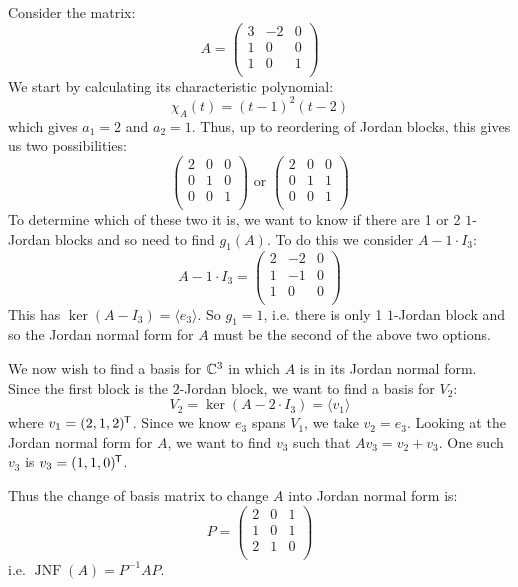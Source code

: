 \documentclass[../main.tex]{subfiles}
\begin{document}
\begin{example}
  Consider the matrix:
  \[
    A = \begin{pmatrix}
    3 & -2 & 0 \\
    1 & 0 & 0 \\
    1 & 0 & 1 \\
    \end{pmatrix}
  \]
  We start by calculating its characteristic polynomial:
  \[
    \chi_{A}(t) = (t - 1)^2(t - 2)
  \]
  which gives $a_{1} = 2$ and $a_{2} = 1$.
  Thus, up to reordering of Jordan blocks, this gives us two possibilities:
  \[
    \begin{pmatrix}
    2 & 0 & 0 \\
    0 & 1 & 0 \\
    0 & 0 & 1 \\
    \end{pmatrix} \text{ or } \begin{pmatrix}
    2 & 0 & 0 \\
    0 & 1 & 1 \\
    0 & 0 & 1 \\
    \end{pmatrix}
  \]
  To determine which of these two it is, we want to know if there are 1 or 2 $1$-Jordan blocks and so need to find $g_1(A)$.
  To do this we consider $A - 1 \cdot I_3$:
  \[
    A - 1 \cdot I_3 = \begin{pmatrix}
    2 & -2 & 0 \\
    1 & -1 & 0 \\
    1 & 0 & 0 \\
    \end{pmatrix}
  \]
  This has $\ker(A - I_3) = \langle e_3 \rangle$.
  So $g_{1} = 1$, i.e. there is only 1 $1$-Jordan block and so the Jordan normal form for $A$ must be the second of the above two options.

  We now wish to find a basis for $\mathbb{C}^3$ in which $A$ is in its Jordan normal form.
  Since the first block is the $2$-Jordan block, we want to find a basis for $V_{2}$:
  \[
    V_{2} = \ker(A - 2 \cdot I_3) = \langle v_1 \rangle
  \]
  where $v_1 = (2, 1, 2)^{{\mkern-1.5mu\mathsf{T}}}$.
  Since we know $e_3$ spans $V_{1}$, we take $v_2 = e_3$.
  Looking at the Jordan normal form for $A$, we want to find $v_3$ such that $Av_3 = v_2 + v_3$.
  One such $v_3$ is $v_3 = (1, 1, 0)^{{\mkern-1.5mu\mathsf{T}}}$.

  Thus the change of basis matrix to change $A$ into Jordan normal form is:
  \[
    P = \begin{pmatrix}
    2 & 0 & 1 \\
    1 & 0 & 1 \\
    2 & 1 & 0 \\
    \end{pmatrix}
  \]
  i.e. $\operatorname{JNF}(A) = P^{-1} A P$.
\end{example}
\end{document}
